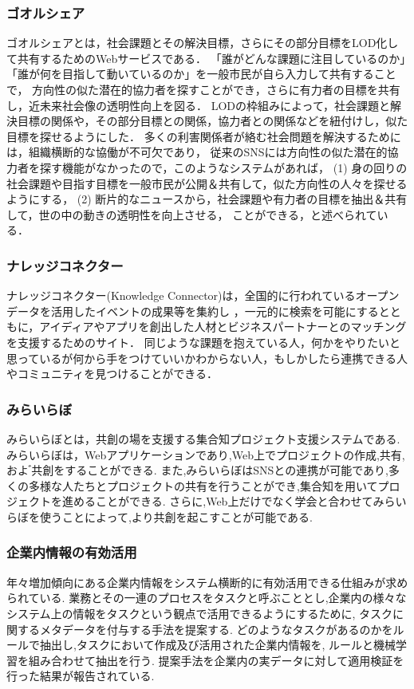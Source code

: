 \subsubsection{ゴオルシェア}
ゴオルシェア\cite{shiramatsu2016}とは，社会課題とその解決目標，さらにその部分目標をLOD化して共有するためのWebサービスである．
「誰がどんな課題に注目しているのか」「誰が何を目指して動いているのか」を一般市民が自ら入力して共有することで，
方向性の似た潜在的協力者を探すことができ，さらに有力者の目標を共有し，近未来社会像の透明性向上を図る．
LODの枠組みによって，社会課題と解決目標の関係や，その部分目標との関係，協力者との関係などを紐付けし，似た目標を探せるようにした．
多くの利害関係者が絡む社会問題を解決するためには，組織横断的な協働が不可欠であり，
従来のSNSには方向性の似た潜在的協力者を探す機能がなかったので，このようなシステムがあれば，
(1) 身の回りの社会課題や目指す目標を一般市民が公開＆共有して，似た方向性の人々を探せるようにする，
(2) 断片的なニュースから，社会課題や有力者の目標を抽出＆共有して，世の中の動きの透明性を向上させる，
ことができる，と述べられている．

\subsubsection{ナレッジコネクター}
ナレッジコネクター(Knowledge Connector)は，全国的に行われているオープンデータを活用したイベントの成果等を集約し
，一元的に検索を可能にするとともに，アイディアやアプリを創出した人材とビジネスパートナーとのマッチングを支援するためのサイト．
同じような課題を抱えている人，何かをやりたいと思っているが何から手をつけていいかわからない人，もしかしたら連携できる人やコミュニティを見つけることができる．

\subsubsection{みらいらぼ}
みらいらぼ\cite{sengoku2016}とは，共創の場を支援する集合知プロジェクト支援システムである.
みらいらぼは，Webアプリケーションであり,Web上でプロジェクトの作成,共有,およ ゙共創をすることができる.
また,みらいらぼはSNSとの連携が可能であり,多くの多様な人たちとプロジェクトの共有を行うことができ,集合知を用いてプロジェクトを進めることができる.
さらに,Web上だけでなく学会と合わせてみらいらぼを使うことによって,より共創を起こすことが可能である.

\subsubsection{企業内情報の有効活用}
年々増加傾向にある企業内情報をシステム横断的に有効活用できる仕組みが求められている.
業務とその一連のプロセスをタスクと呼ぶこととし,企業内の様々なシステム上の情報をタスクという観点で活用できるようにするために,
タスクに関するメタデータを付与する手法\cite{metadata}を提案する.
どのようなタスクがあるのかをルールで抽出し,タスクにおいて作成及び活用された企業内情報を,
ルールと機械学習を組み合わせて抽出を行う.
提案手法を企業内の実データに対して適用検証を行った結果が報告されている.

